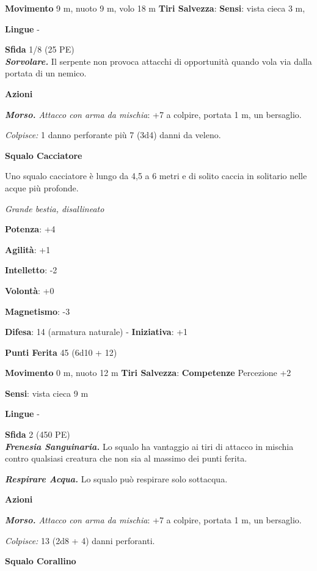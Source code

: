 \begin{multicols}{2}
\textbf{Movimento} 9 m, nuoto 9 m, volo 18 m
\textbf{Tiri Salvezza}:
\textbf{Sensi}: vista cieca 3 m, 

\textbf{Lingue} -

\textbf{Sfida} 1/8 (25 PE)\smallskip\\

\emph{\textbf{Sorvolare.}} Il serpente non provoca attacchi di
opportunità quando vola via dalla portata di un nemico.

\smallskip\textbf{Azioni}

\emph{\textbf{Morso.} Attacco con arma da mischia}: +7 a colpire,
portata 1 m, un bersaglio.

\emph{Colpisce:} 1 danno perforante più 7 (3d4) danni da veleno.

\textbf{Squalo Cacciatore}

Uno squalo cacciatore è lungo da 4,5 a 6 metri e di solito caccia in
solitario nelle acque più profonde.

\emph{Grande bestia, disallineato}

\textbf{Potenza}: +4

\textbf{Agilità}: +1

\textbf{Intelletto}: -2

\textbf{Volontà}: +0

\textbf{Magnetismo}: -3

\textbf{Difesa}: 14 (armatura naturale) - \textbf{Iniziativa}: +1

\textbf{Punti Ferita} 45 (6d10 + 12)

\textbf{Movimento} 0 m, nuoto 12 m
\textbf{Tiri Salvezza}:
\textbf{Competenze} Percezione +2

\textbf{Sensi}: vista cieca 9 m

\textbf{Lingue} -

\textbf{Sfida} 2 (450 PE)\smallskip\\

\emph{\textbf{Frenesia Sanguinaria.}} Lo squalo ha vantaggio ai tiri di
attacco in mischia contro qualsiasi creatura che non sia al massimo dei
punti ferita.

\emph{\textbf{Respirare Acqua.}} Lo squalo può respirare solo sottacqua.

\smallskip\textbf{Azioni}

\emph{\textbf{Morso.} Attacco con arma da mischia}: +7 a colpire,
portata 1 m, un bersaglio.

\emph{Colpisce:} 13 (2d8 + 4) danni perforanti.

\textbf{Squalo Corallino}


\end{multicols}
